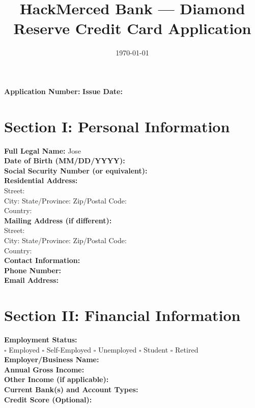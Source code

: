 \documentclass[12pt,a4paper]{article}
\begin{document}
\title{\textbf{HackMerced Bank --- Diamond Reserve Credit Card Application}}
\author{}
\date{\today}
\maketitle

\thispagestyle{empty}

\begin{center}
\textbf{Application Number:} \underline{\hspace{2in}} \hspace{1cm}
\textbf{Issue Date:} \underline{\hspace{1.5in}}
\end{center}

\vspace{1cm}

\section*{Section I: Personal Information}
\noindent\textbf{Full Legal Name:} Jose\\[1ex]
\textbf{Date of Birth (MM/DD/YYYY):} \\[1ex]
\textbf{Social Security Number (or equivalent):} \\[1ex]
\textbf{Residential Address:}\\
\quad Street: \\[1ex]
\quad City:  \quad State/Province:  \quad Zip/Postal Code: \\[1ex]
\quad Country: \\[2ex]
\textbf{Mailing Address (if different):}\\
\quad Street: \\[1ex]
\quad City:  \quad State/Province:  \quad Zip/Postal Code: \\[1ex]
\quad Country: \\[2ex]
\textbf{Contact Information:}\\[1ex]
\quad \textbf{Phone Number:} \\[1ex]
\quad \textbf{Email Address:} \\[2ex]

\section*{Section II: Financial Information}
\noindent\textbf{Employment Status:}\\[1ex]
\hspace{0.5cm} $\square$ Employed \hspace{1cm} $\square$ Self-Employed \hspace{1cm} $\square$ Unemployed \hspace{1cm} $\square$ Student \hspace{1cm} $\square$ Retired\\[2ex]
\textbf{Employer/Business Name:} \\[2ex]
\textbf{Annual Gross Income:} \\[2ex]
\textbf{Other Income (if applicable):} \\[2ex]
\textbf{Current Bank(s) and Account Types:} \\[2ex]
\textbf{Credit Score (Optional):} \\[2ex]
\end{document}
